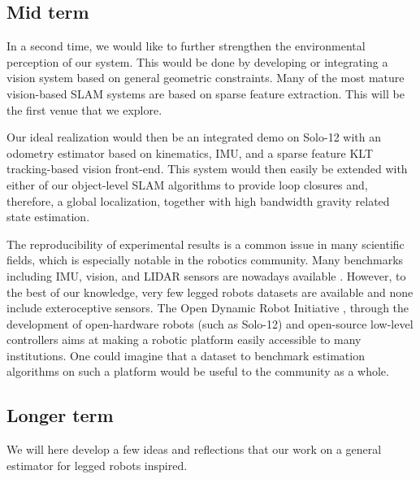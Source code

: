 \subsection{Mid term}

In a second time, we would like to further strengthen the environmental perception of our system. This would be done by developing or integrating a vision system
based on general geometric constraints. Many of the most mature vision-based SLAM systems are based on sparse feature extraction. This will be 
the first venue that we explore. 

Our ideal realization would then be an integrated demo on Solo-12 with an odometry estimator based on kinematics, IMU, and a sparse feature KLT \cite{baker2004lucas} tracking-based 
vision front-end. This system would then easily be extended with either of our object-level SLAM algorithms to provide loop closures and, therefore, a global localization, together
with high bandwidth gravity related state estimation.

The reproducibility of experimental results is a common issue in many scientific fields, which is especially notable in the robotics community. Many benchmarks including 
IMU, vision, and LIDAR sensors are nowadays available \cite{Burri25012016, cortes2018advio, kasper2019benchmark, zhang2021multi}. However, to the best of our knowledge,
very few legged robots datasets are available \cite{fink2020dls, ahmadi2021semi} and none include exteroceptive sensors. The Open Dynamic Robot Initiative \cite{grimminger2020open}, 
through the development of open-hardware robots (such as Solo-12) and open-source low-level controllers aims at making a robotic platform easily accessible to
many institutions. One could imagine that a dataset to benchmark estimation algorithms on such a platform would be useful to the community as a whole. 


\subsection{Longer term}

We will here develop a few ideas and reflections that our work on a general estimator for legged robots inspired.


